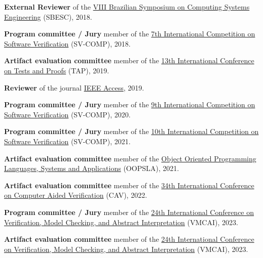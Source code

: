 \documentclass[letterpaper]{article}
\renewenvironment{itemize}{
  \begin{list}{}{
    \setlength{\leftmargin}{1.5em}
  }
}{
  \end{list}
}
\begin{document}
\begin{itemize}
  \item {\bf External Reviewer} of the \href{https://www.computer.org/csdl/proceedings-article/sbesc/2018/024000z015/19m3lVxurZe}{VIII Brazilian Symposium on Computing Systems Engineering} (SBESC), 2018.
  
  \item {\bf Program committee / Jury} member of the \href{https://sv-comp.sosy-lab.org/2018/committee.php}{7th International Competition on Software Verification} (SV-COMP), 2018.
  
  \item {\bf Artifact evaluation committee} member of the \href{https://tap.sosy-lab.org/2019/committee.php}{13th International Conference on Tests and Proofs} (TAP), 2019.
  
  \item {\bf Reviewer} of the journal \href{https://ieeeaccess.ieee.org}{IEEE Access}, 2019.
  
  \item {\bf Program committee / Jury} member of the \href{https://sv-comp.sosy-lab.org/2020/committee.php}{9th International Competition on Software Verification} (SV-COMP), 2020.
  
  \item {\bf Program committee / Jury} member of the \href{https://sv-comp.sosy-lab.org/2021/committee.php}{10th International Competition on Software Verification} (SV-COMP), 2021.
  
    \item {\bf Artifact evaluation committee} member of the \href{https://2021.splashcon.org/track/splash-2021-Artifacts}{Object Oriented Programming Languages, Systems and Applications} (OOPSLA), 2021.
    
      \item {\bf Artifact evaluation committee} member of the \href{http://i-cav.org/2022/organization/}{34th International Conference on Computer Aided Verification} (CAV), 2022.
      
        \item {\bf Program committee / Jury} member of the \href{https://vmcai-2023.github.io/}{24th International Conference on Verification, Model Checking, and Abstract Interpretation} (VMCAI), 2023.
        
        \item {\bf Artifact evaluation committee} member of the \href{https://vmcai-2023.github.io/}{24th International Conference on Verification, Model Checking, and Abstract Interpretation} (VMCAI), 2023.
\end{itemize}
\end{document}
